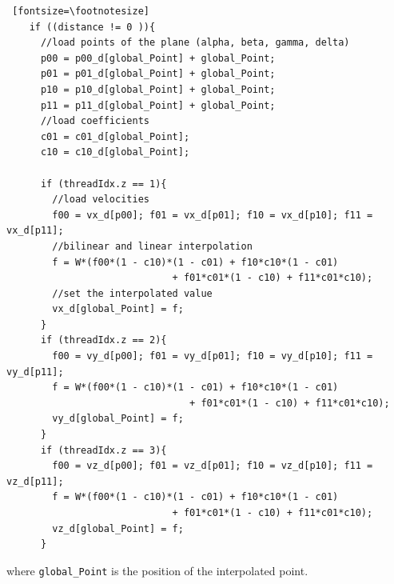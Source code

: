 \begin{Verbatim} [fontsize=\footnotesize]
    if ((distance != 0 )){
      //load points of the plane (alpha, beta, gamma, delta)
      p00 = p00_d[global_Point] + global_Point;
      p01 = p01_d[global_Point] + global_Point;
      p10 = p10_d[global_Point] + global_Point;
      p11 = p11_d[global_Point] + global_Point;
      //load coefficients
      c01 = c01_d[global_Point];
      c10 = c10_d[global_Point];

      if (threadIdx.z == 1){
        //load velocities
        f00 = vx_d[p00]; f01 = vx_d[p01]; f10 = vx_d[p10]; f11 = vx_d[p11];
        //bilinear and linear interpolation
        f = W*(f00*(1 - c10)*(1 - c01) + f10*c10*(1 - c01)
                             + f01*c01*(1 - c10) + f11*c01*c10);
        //set the interpolated value
        vx_d[global_Point] = f;
      }
      if (threadIdx.z == 2){
        f00 = vy_d[p00]; f01 = vy_d[p01]; f10 = vy_d[p10]; f11 = vy_d[p11];
        f = W*(f00*(1 - c10)*(1 - c01) + f10*c10*(1 - c01)
                                + f01*c01*(1 - c10) + f11*c01*c10);
        vy_d[global_Point] = f;
      }
      if (threadIdx.z == 3){
        f00 = vz_d[p00]; f01 = vz_d[p01]; f10 = vz_d[p10]; f11 = vz_d[p11];
        f = W*(f00*(1 - c10)*(1 - c01) + f10*c10*(1 - c01)
                             + f01*c01*(1 - c10) + f11*c01*c10);
        vz_d[global_Point] = f;
      }
\end{Verbatim}

where \texttt{global\_Point} is the position of the interpolated point.

